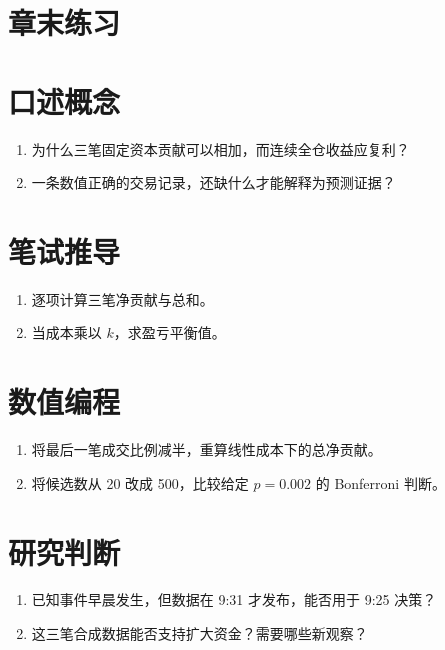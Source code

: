\section*{章末练习}
\section*{口述概念}
\begin{enumerate}[leftmargin=*]
  \item 为什么三笔固定资本贡献可以相加，而连续全仓收益应复利？
  \item 一条数值正确的交易记录，还缺什么才能解释为预测证据？
\end{enumerate}
\section*{笔试推导}
\begin{enumerate}[leftmargin=*]
  \item 逐项计算三笔净贡献与总和。
  \item 当成本乘以 $k$，求盈亏平衡值。
\end{enumerate}
\section*{数值编程}
\begin{enumerate}[leftmargin=*]
  \item 将最后一笔成交比例减半，重算线性成本下的总净贡献。
  \item 将候选数从 20 改成 500，比较给定 $p=0.002$ 的 Bonferroni 判断。
\end{enumerate}
\section*{研究判断}
\begin{enumerate}[leftmargin=*]
  \item 已知事件早晨发生，但数据在 9:31 才发布，能否用于 9:25 决策？
  \item 这三笔合成数据能否支持扩大资金？需要哪些新观察？
\end{enumerate}
